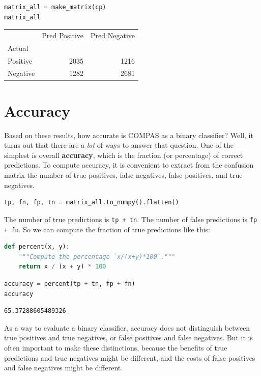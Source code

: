 \begin{lstlisting}[language=Python,style=source]
matrix_all = make_matrix(cp)
matrix_all
\end{lstlisting}

\begin{tabular}{lrr}
\midrule
 & Pred Positive & Pred Negative \\
Actual &  &  \\
\midrule
Positive & 2035 & 1216 \\
Negative & 1282 & 2681 \\
\midrule
\end{tabular}

\section{Accuracy}\label{accuracy}

Based on these results, how accurate is COMPAS as a binary classifier?
Well, it turns out that there are a \emph{lot} of ways to answer that
question. One of the simplest is overall \textbf{accuracy}, which is the
fraction (or percentage) of correct predictions. To compute accuracy, it
is convenient to extract from the confusion matrix the number of true
positives, false negatives, false positives, and true negatives.

\begin{lstlisting}[language=Python,style=source]
tp, fn, fp, tn = matrix_all.to_numpy().flatten()
\end{lstlisting}

The number of true predictions is \passthrough{\lstinline!tp + tn!}. The
number of false predictions is \passthrough{\lstinline!fp + fn!}. So we
can compute the fraction of true predictions like this:

\begin{lstlisting}[language=Python,style=source]
def percent(x, y):
    """Compute the percentage `x/(x+y)*100`."""
    return x / (x + y) * 100
\end{lstlisting}

\begin{lstlisting}[language=Python,style=source]
accuracy = percent(tp + tn, fp + fn)
accuracy
\end{lstlisting}

\begin{lstlisting}[style=output]
65.37288605489326
\end{lstlisting}

As a way to evaluate a binary classifier, accuracy does not distinguish
between true positives and true negatives, or false positives and false
negatives. But it is often important to make these distinctions, because
the benefits of true predictions and true negatives might be different,
and the costs of false positives and false negatives might be different.

